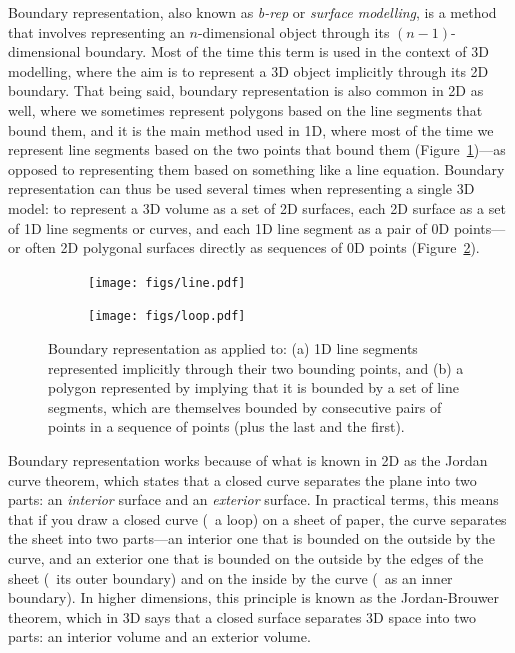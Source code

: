 Boundary representation, also known as \emph{b-rep} or \emph{surface modelling}, is a method that involves representing an \(n\)-dimensional object through its \((n-1)\)-dimensional boundary.
Most of the time this term is used in the context of 3D modelling, where the aim is to represent a 3D object implicitly through its 2D boundary.
That being said, boundary representation is also common in 2D as well, where we sometimes represent polygons based on the line segments that bound them, and it is the main method used in 1D, where most of the time we represent line segments based on the two points that bound them (Figure~\ref{subfig:line})---as opposed to representing them based on something like a line equation.
Boundary representation can thus be used several times when representing a single 3D model: to represent a 3D volume as a set of 2D surfaces, each 2D surface as a set of 1D line segments or curves, and each 1D line segment as a pair of 0D points---or often 2D polygonal surfaces directly as sequences of 0D points (Figure~\ref{subfig:loop}).

\begin{figure}
\centering
\begin{subfigure}[b]{0.2\linewidth}
\texttt{[image: figs/line.pdf]}
\caption{}%
\label{subfig:line}
\end{subfigure}
\quad
\begin{subfigure}[b]{0.3\linewidth}
\texttt{[image: figs/loop.pdf]}
\caption{}%
\label{subfig:loop}
\end{subfigure}
\caption[Boundary representation]{Boundary representation as applied to: (a) 1D line segments represented implicitly through their two bounding points, and (b) a polygon represented by implying that it is bounded by a set of line segments, which are themselves bounded by consecutive pairs of points in a sequence of points (plus the last and the first).}%
\label{fig:brep}
\end{figure}

Boundary representation works because of what is known in 2D as the Jordan curve theorem, which states that a closed curve separates the plane into two parts: an \emph{interior} surface and an \emph{exterior} surface.
In practical terms, this means that if you draw a closed curve (\ie\ a loop) on a sheet of paper, the curve separates the sheet into two parts---an interior one that is bounded on the outside by the curve, and an exterior one that is bounded on the outside by the edges of the sheet (\ie\ its outer boundary) and on the inside by the curve (\ie\ as an inner boundary).
In higher dimensions, this principle is known as the Jordan-Brouwer theorem, which in 3D says that a closed surface separates 3D space into two parts: an interior volume and an exterior volume.

